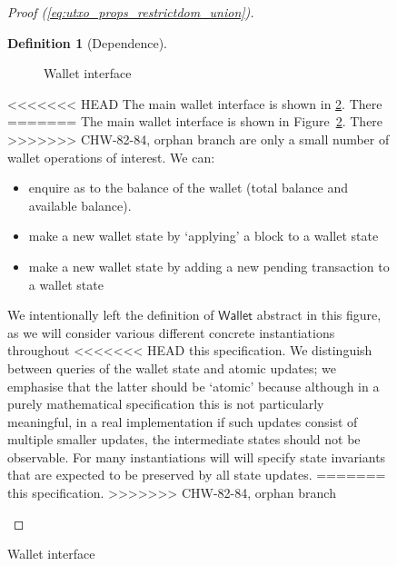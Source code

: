 \documentclass{article}
\theoremstyle{definition}{
  \newtheorem{lemma}{Lemma}[section] %
  \newtheorem{definition}[lemma]{Definition}
}
\theoremstyle{theorem}{
  \newtheorem{invariant}[lemma]{Invariant}
  \newtheorem{proofobligation}[lemma]{Proof Obligation}
}
\newtheorem{definition}[lemma]{Definition}
\numberwithin{equation}{lemma}
\begin{document}
\begin{figure}
\begin{proof}[Proof (\eqref{eq:utxo_props_restrictdom_union})]
\begin{definition}[Dependence]
\begin{figure}
\caption{\label{fig:wallet_interface}Wallet interface}
\end{figure}

<<<<<<< HEAD
The main wallet interface is shown in \cref{fig:wallet_interface}. There
=======
The main wallet interface is shown in Figure~\ref{fig:wallet_interface}. There
>>>>>>> CHW-82-84, orphan branch
are only a small number of wallet operations of interest. We can:
%
\begin{itemize}
\item enquire as to the balance of the wallet (total balance and
      available balance).
\item make a new wallet state by `applying' a block to a wallet state
\item make a new wallet state by adding a new pending transaction to a wallet
      state
\end{itemize}
%
We intentionally left the definition of $\mathsf{Wallet}$ abstract in this
figure, as we will consider various different concrete instantiations throughout
<<<<<<< HEAD
this specification. We distinguish between queries of the wallet state
and atomic updates; we emphasise that the latter should be `atomic' because
although in a purely mathematical specification this is not particularly
meaningful, in a real implementation if such updates consist of multiple
smaller updates, the intermediate states should not be observable. For many
instantiations will will specify state invariants that are expected to be
preserved by all state updates.
=======
this specification.
>>>>>>> CHW-82-84, orphan branch


\end{definition}
\end{proof}
\end{figure}
\end{document}
